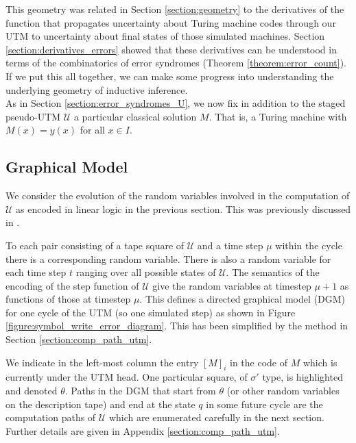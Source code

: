 \documentclass[english,letter paper,12pt,reqno]{article}
\theoremstyle{definition}
\begin{document}
This geometry was related in Section \ref{section:geometry} to the derivatives of the function that propagates uncertainty about Turing machine codes through our UTM to uncertainty about final states of those simulated machines. Section \ref{section:derivatives_errors} showed that these derivatives can be understood in terms of the combinatorics of error syndromes (Theorem \ref{theorem:error_count}). If we put this all together, we can make some progress into understanding the underlying geometry of inductive inference.
\\

As in Section \ref{section:error_syndromes_U}, we now fix in addition to the staged pseudo-UTM $\mathcal{U}$ a particular classical solution $M$. That is, a Turing machine with $M(x) = y(x)$ for all $x \in I$.

\subsection{Graphical Model}\label{section:graphical_model_utm}

We consider the evolution of the random variables involved in the computation of $\mathcal{U}$ as encoded in linear logic in the previous section. This was previously discussed in \cite[\S 6.2]{clift2018derivatives}.

To each pair consisting of a tape square of $\mathcal{U}$ and a time step $\mu$ within the cycle there is a corresponding random variable. There is also a random variable for each time step $t$ ranging over all possible states of $\mathcal{U}$. The semantics of the encoding of the step function of $\mathcal{U}$ give the random variables at timestep $\mu + 1$ as functions of those at timestep $\mu$. This defines a directed graphical model (DGM) for one cycle of the UTM (so one simulated step) as shown in Figure \ref{figure:symbol_write_error_diagram}. This has been simplified by the method in Section \ref{section:comp_path_utm}.

We indicate in the left-most column the entry $[M]_i$ in the code of $M$ which is currently under the UTM head. One particular square, of $\sigma'$ type, is highlighted and denoted $\theta$. Paths in the DGM that start from $\theta$ (or other random variables on the description tape) and end at the state $q$ in some future cycle are the computation paths of $\mathcal{U}$ which are enumerated carefully in the next section. Further details are given in Appendix \ref{section:comp_path_utm}.
\end{document}
